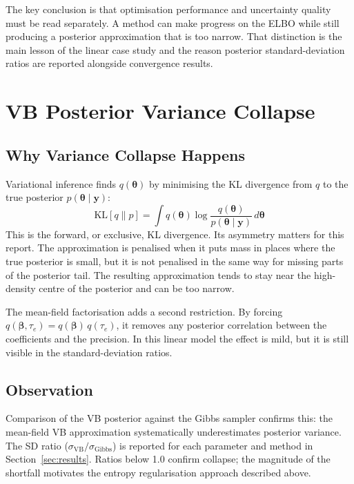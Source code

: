 \documentclass[11pt,a4paper]{article}
\begin{document}
The key conclusion is that optimisation performance and uncertainty quality must be read separately. A method can make progress on the ELBO while still producing a posterior approximation that is too narrow. That distinction is the main lesson of the linear case study and the reason posterior standard-deviation ratios are reported alongside convergence results.

\newpage
\nocite{*}
\printbibliography
\setcounter{secnumdepth}{1}
\appendix
\renewcommand{\thesection}{Appendix~\Alph{section}}

\newpage
\section{VB Posterior Variance Collapse}
\label{app:vb-collapse}

\subsection*{Why Variance Collapse Happens}

Variational inference finds $q(\bm{\theta})$ by minimising the KL divergence from $q$ to the true posterior $p(\bm{\theta}\mid\bm{y})$:
\begin{equation}
  \mathrm{KL}[q \| p] = \int q(\bm{\theta}) \log \frac{q(\bm{\theta})}{p(\bm{\theta}\mid\bm{y})} \, d\bm{\theta}
\end{equation}
This is the forward, or exclusive, KL divergence. Its asymmetry matters for this report. The approximation is penalised when it puts mass in places where the true posterior is small, but it is not penalised in the same way for missing parts of the posterior tail. The resulting approximation tends to stay near the high-density centre of the posterior and can be too narrow.

The mean-field factorisation adds a second restriction. By forcing $q(\bm{\beta}, \tau_e) = q(\bm{\beta})\,q(\tau_e)$, it removes any posterior correlation between the coefficients and the precision. In this linear model the effect is mild, but it is still visible in the standard-deviation ratios.

\subsection*{Observation}

Comparison of the VB posterior against the Gibbs sampler confirms this: the mean-field VB approximation systematically underestimates posterior variance. The SD ratio ($\sigma_{\mathrm{VB}} / \sigma_{\mathrm{Gibbs}}$) is reported for each parameter and method in Section~\ref{sec:results}. Ratios below 1.0 confirm collapse; the magnitude of the shortfall motivates the entropy regularisation approach described above.
\end{document}
